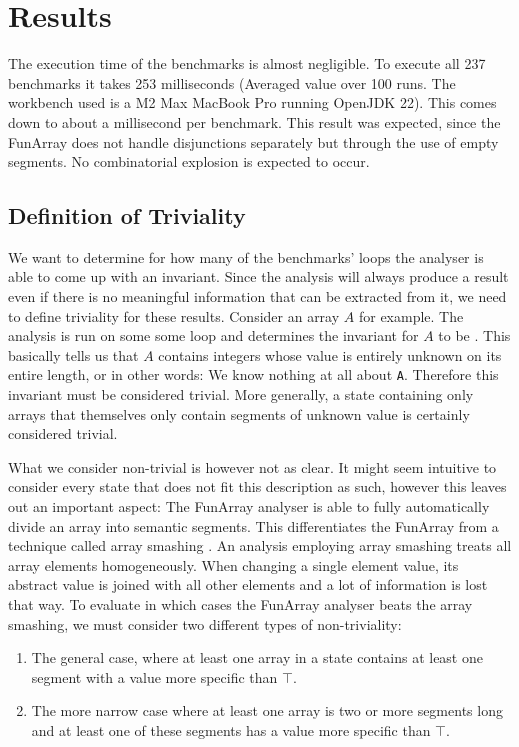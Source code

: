\section{Results}

The execution time of the benchmarks is almost negligible. To execute all 237 benchmarks it takes 253 milliseconds (Averaged value over 100 runs. The workbench used is a M2 Max MacBook Pro running OpenJDK 22). This comes down to about a millisecond per benchmark. This result was expected, since the FunArray does not handle disjunctions separately but through the use of empty segments. No combinatorial explosion is expected to occur.

\subsection{Definition of Triviality}

We want to determine for how many of the benchmarks' loops the analyser is able to come up with an invariant. Since the analysis will always produce a result even if there is no meaningful information that can be extracted from it, we need to define triviality for these results. Consider an array $A$ for example. The analysis is run on some some loop and determines the invariant for $A$ to be . This basically tells us that $A$ contains integers whose value is entirely unknown on its entire length, or in other words: We know nothing at all about \texttt{A}. Therefore this invariant must be considered trivial. More generally, a state containing only arrays that themselves only contain segments of unknown value is certainly considered trivial.

What we consider non-trivial is however not as clear. It might seem intuitive to consider every state that does not fit this description as such, however this leaves out an important aspect: The FunArray analyser is able to fully automatically divide an array into semantic segments. This differentiates the FunArray from a technique called array smashing \cite{cousot2011}. An analysis employing array smashing treats all array elements homogeneously. When changing a single element value, its abstract value is joined with all other elements and a lot of information is lost that way. To evaluate in which cases the FunArray analyser beats the array smashing, we must consider two different types of non-triviality:

\begin{enumerate}
	\item The general case, where at least one array in a state contains at least one segment with a value more specific than $\top$.
	\item The more narrow case where at least one array is two or more segments long and at least one of these segments has a value more specific than $\top$.
\end{enumerate}

